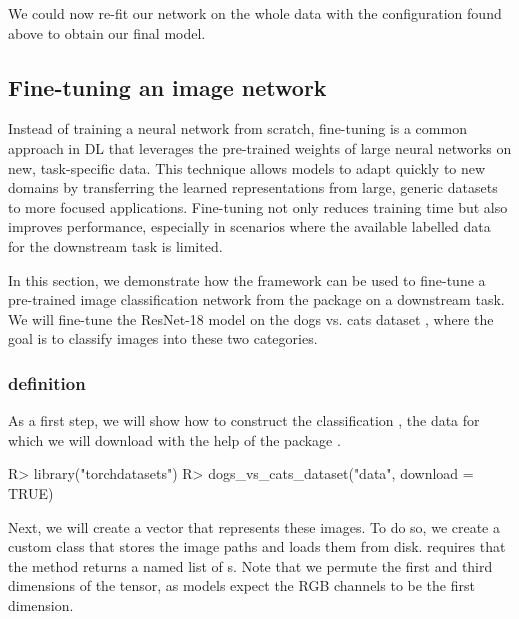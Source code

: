 \documentclass[article]{jss}
\theoremstyle{definition}
\begin{document}
We could now re-fit our network on the whole data with the configuration found above to obtain our final model.

\subsection{Fine-tuning an image network}\label{sec:finetuning}

Instead of training a neural network from scratch, fine-tuning is a common approach in DL that leverages the pre-trained weights of large neural networks on new, task-specific data.
This technique allows models to adapt quickly to new domains by transferring the learned representations from large, generic datasets to more focused applications.
Fine-tuning not only reduces training time but also improves performance, especially in scenarios where the available labelled data for the downstream task is limited.

In this section, we demonstrate how the  framework can be used to fine-tune a pre-trained image classification network from the  package on a downstream task.
We will fine-tune the ResNet-18 model \citep{he2016deep} on the dogs vs. cats dataset \citep{ref-dogs-vs-cats2013}, where the goal is to classify images into these two categories.

\subsubsection[Task definition]{ definition}

As a first step, we will show how to construct the classification , the data for which we will download with the help of the  \rlang{} package \citep{torchdatasets}.

\begin{CodeInput}
R> library("torchdatasets")
R> dogs_vs_cats_dataset("data", download = TRUE)
\end{CodeInput}

Next, we will create a  vector that represents these images.
To do so, we create a custom  class that stores the image paths and loads them from disk.
 requires that the  method returns a named list of s.
Note that we permute the first and third dimensions of the tensor, as  models expect the RGB channels to be the first dimension.
\end{document}
